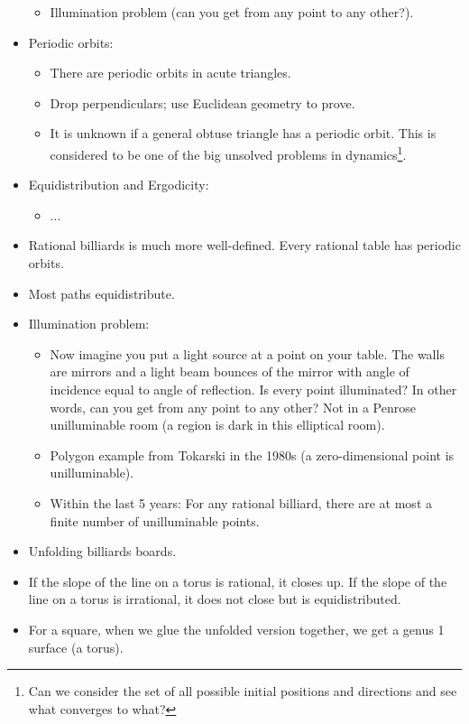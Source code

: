 \documentclass[../apprentice.tex]{subfiles}
\begin{document}
\begin{itemize}
\begin{itemize}
        \item Illumination problem (can you get from any point to any other?).
    \end{itemize}
    \item Periodic orbits:
    \begin{itemize}
        \item There are periodic orbits in acute triangles.
        \item Drop perpendiculars; use Euclidean geometry to prove.
        \item It is unknown if a general obtuse triangle has a periodic orbit. This is considered to be one of the big unsolved problems in dynamics\footnote{Can we consider the set of all possible initial positions and directions and see what converges to what?}.
    \end{itemize}
    \item Equidistribution and Ergodicity:
    \begin{itemize}
        \item ...
    \end{itemize}
    \item Rational billiards is much more well-defined. Every rational table has periodic orbits.
    \item Most paths equidistribute.
    \item Illumination problem:
    \begin{itemize}
        \item Now imagine you put a light source at a point on your table. The walls are mirrors and a light beam bounces of the mirror with angle of incidence equal to angle of reflection. Is every point illuminated? In other words, can you get from any point to any other? Not in a Penrose unilluminable room (a region is dark in this elliptical room).
        \item Polygon example from Tokarski in the 1980s (a zero-dimensional point is unilluminable).
        \item Within the last 5 years: For any rational billiard, there are at most a finite number of unilluminable points.
    \end{itemize}
    \item Unfolding billiards boards.
    \item If the slope of the line on a torus is rational, it closes up. If the slope of the line on a torus is irrational, it does not close but is equidistributed.
    \item For a square, when we glue the unfolded version together, we get a genus 1 surface (a torus).

\end{itemize}
\end{document}
